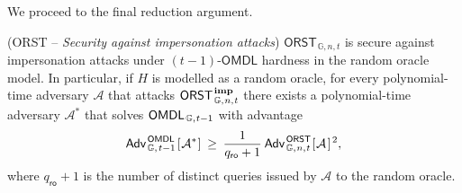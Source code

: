 \documentclass{iacrtrans}
\begin{document}
\noindent
We proceed to the final reduction argument.

\begin{thm}\label{theorem_orst_security}
\textup{(\textsf{ORST} --
\textit{Security against impersonation attacks})}
$\mathsf{ORST}_{\hspace{1pt}\mathbb{G}, n, t}$
is secure against impersonation attacks
under $(t-1)$-$\mathsf{OMDL}$ hardness
in the random oracle model.
In particular, if $H$ is modelled as a random oracle,
for every polynomial-time adversary $\mathcal{A}$ that attacks
$\mathsf{ORST}
	_{\hspace{1pt}\mathbb{G},\hspace{0.5pt} n,\hspace{0.5pt} t}
	^\mathbf{\hspace{1pt}imp}
$
there exists a polynomial-time
adversary $\mathcal{A}^*$ that solves
$\mathsf{OMDL}
	_{\hspace{1pt}\mathbb{G},\hspace{0.5pt} t-1}
$
with advantage
\vspace{5pt}
\begin{equation}\label{orst_security_bound}
	\mathsf{Adv}
		_{\hspace{1pt}\mathbb{G},\hspace{1pt} t-1}
		^{\hspace{1pt}\mathsf{OMDL}}
		\hspace{1pt}
		[
			\hspace{0.5pt}
			\mathcal{A}^*
			\hspace{0.5pt}
		]
	\hspace{2pt}
	\ge
	\hspace{2pt}
	\frac{1}{q_{\mathsf{ro}} + 1}
	\hspace{2pt}
	\mathsf{Adv}
		_{\hspace{1pt}\mathbb{G}, \hspace{0.5pt}n, \hspace{0.5pt}t}
		^{\hspace{1pt}\mathsf{ORST}}
		\hspace{0.5pt}
		[
			\hspace{0.5pt}
			\mathcal{A}
			\hspace{1pt}
		] ^ {\hspace{1pt}2},
\vspace{5pt}
\end{equation}
where $q_\mathsf{ro} + 1$ is the number of distinct queries
issued by $\mathcal{A}$ to the random oracle.
\end{thm}
\end{document}
